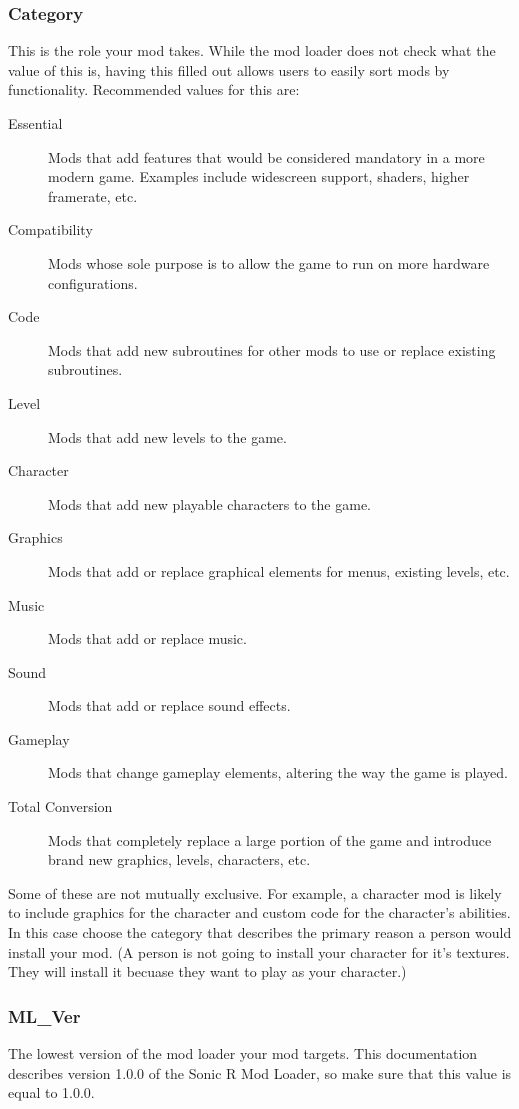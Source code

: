 \documentclass[12pt,a4paper,notitlepage]{article}
\begin{document}
\subsubsection{Category}
\label{subsubsec:create-meta-cat}
This is the role your mod takes. While the mod loader does not check what the value of this is, having this filled out allows users to easily sort mods by functionality. Recommended values for this are:

\begin{description}
\item[Essential] Mods that add features that would be considered mandatory in a more modern game. Examples include widescreen support, shaders, higher framerate, etc. 
\item[Compatibility] Mods whose sole purpose is to allow the game to run on more hardware configurations.
\item[Code] Mods that add new subroutines for other mods to use or replace existing subroutines.
\item[Level] Mods that add new levels to the game.
\item[Character] Mods that add new playable characters to the game.
\item[Graphics] Mods that add or replace graphical elements for menus, existing levels, etc.
\item[Music] Mods that add or replace music.
\item[Sound] Mods that add or replace sound effects.
\item[Gameplay] Mods that change gameplay elements, altering the way the game is played.
\item[Total Conversion] Mods that completely replace a large portion of the game and introduce brand new graphics, levels, characters, etc.

\end{description}
Some of these are not mutually exclusive. For example, a character mod is likely to include graphics for the character and custom code for the character's abilities. In this case choose the category that describes the primary reason a person would install your mod. (A person is not going to install your character for it's textures. They will install it becuase they want to play as your character.)

\subsubsection{ML\_Ver}
\label{subsubsec:create-meta-mlver}
The lowest version of the mod loader your mod targets. This documentation describes version 1.0.0 of the Sonic R Mod Loader, so make sure that this value is equal to 1.0.0.
\end{document}
